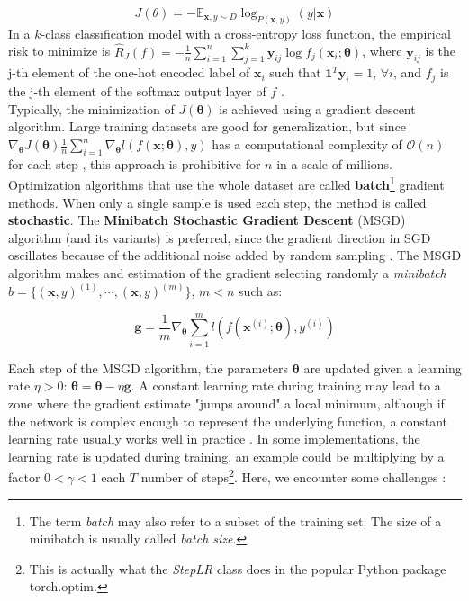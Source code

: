 \begin{equation}
    J(\theta) = -\mathbb{E}_{\mathbf{x}, y \sim D} \log_{P(\mathbf{x}, y)} (y | \mathbf{x})
\end{equation}
In a $k$-class classification model with a cross-entropy loss function, the empirical risk to minimize is $\hat{R}_J (f) = -\frac{1}{n}\sum_{i=1}^n \sum_{j=1}^k \mathbf{y}_{ij} \log f_j (\mathbf{x}_i; \boldsymbol{\theta})$, where $\mathbf{y}_{ij}$ is the j-th element of the one-hot encoded label of $\mathbf{x}_i$ such that $\mathbf{1}^T \mathbf{y}_i = 1$, $\forall i$, and $f_j$ is the j-th element of the softmax output layer of $f$ \cite{zhang2018}.\\
Typically, the minimization of $J(\boldsymbol{\theta})$ is achieved using a gradient descent algorithm. Large training datasets are good for generalization, but since $\nabla_{\boldsymbol{\theta}} J (\boldsymbol{\theta}) \frac{1}{n}\sum_{i=1}^n \nabla_{\boldsymbol{\theta}} l(f(\mathbf{x}; \boldsymbol{\theta}), y)$ has a computational complexity of $\mathcal{O}(n)$ for each step \cite{goodfellow2016}, this approach is prohibitive for $n$ in a scale of millions. Optimization algorithms that use the whole dataset are called \textbf{batch}\footnote{The term \textit{batch} may also refer to a subset of the training set. The size of a minibatch is usually called \textit{batch size}.} gradient methods.
When only a single sample is used each step, the method is called \textbf{stochastic}. The \textbf{Minibatch Stochastic Gradient Descent} (MSGD) algorithm (and its variants) is preferred, since the gradient direction in SGD oscillates because of the additional noise added by random sampling \cite{sun2019}.
The MSGD algorithm makes and estimation of the gradient selecting randomly a \textit{minibatch} $b = \{(\mathbf{x}, y)^{(1)},\cdots, (\mathbf{x}, y)^{(m)}\}$, $m<n$ such as:

\begin{equation}
    \label{eqn:gradient_estimate}
    \mathbf{g} = \frac{1}{m} \nabla_{\boldsymbol{\theta}} \sum_{i=1}^m l(f(\mathbf{x}^{(i)}; \boldsymbol{\theta}), y^{(i)})
\end{equation}

Each step of the MSGD algorithm, the parameters $\boldsymbol{\theta}$ are updated given a learning rate $\eta > 0$: $\boldsymbol{\theta} = \boldsymbol{\theta} - \eta \mathbf{g}$. A constant learning rate during training may lead to a zone where the gradient estimate "jumps around" a local minimum, although if the network is complex enough to represent the underlying function, a constant learning rate usually works well in practice \cite{sun2019a}. In some implementations, the learning rate is updated during training, an example could be multiplying by a factor $0<\gamma<1$ each $T$ number of steps\footnote{This is actually what the \textit{StepLR} class does in the popular Python package torch.optim.}.
Here, we encounter some challenges \cite{ruder2017}:

